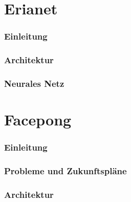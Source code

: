 \documentclass[12pt]{article}
\begin{document}
\tableofcontents
\newpage

\part{Erianet}
\section{Einleitung}
\section{Architektur}
\section{Neurales Netz}

\part{Facepong}
\section{Einleitung}
\section{Probleme und Zukunftspläne}
\section{Architektur}
\end{document}
